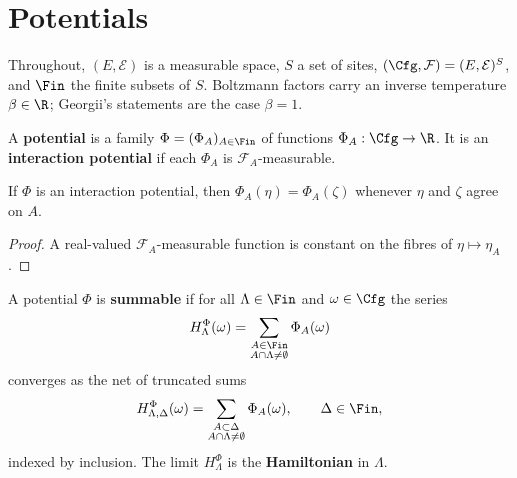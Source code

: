 \section{Potentials}

Throughout, $(E,\mathcal{E})$ is a measurable space, $S$ a set of sites,
$(\Cfg,\mathcal{F})=(E,\mathcal{E})^S$, and $\Fin$ the finite subsets of $S$.
Boltzmann factors carry an inverse temperature $\beta\in\R$; Georgii's statements are the case
$\beta=1$.

\begin{definition}
    \label{def:pot-potential}
    \leanok{}

    A \textbf{potential} is a family $\Phi=(\Phi_A)_{A\in\Fin}$ of functions
    $\Phi_A:\Cfg\to\R$. It is an \textbf{interaction potential} if each $\Phi_A$ is
    $\mathcal{F}_A$-measurable.
\end{definition}

\begin{lemma}
    \label{lem:pot-depends-on}
    \leanok{}

    If $\Phi$ is an interaction potential, then $\Phi_A(\eta)=\Phi_A(\zeta)$ whenever
    $\eta$ and $\zeta$ agree on $A$.
\end{lemma}
\begin{proof}
    \leanok{}

    A real-valued $\mathcal{F}_A$-measurable function is constant on the fibres of
    $\eta\mapsto\eta_A$.
\end{proof}

\begin{definition}
    \label{def:pot-hamiltonian}
    \leanok{}

    A potential $\Phi$ is \textbf{summable} if for all $\Lambda\in\Fin$ and $\omega\in\Cfg$ the
    series
    \[
      H_\Lambda^\Phi(\omega)=\sum_{\substack{A\in\Fin\\ A\cap\Lambda\neq\emptyset}}\Phi_A(\omega)
    \]
    converges as the net of truncated sums
    \[
      H_{\Lambda,\Delta}^\Phi(\omega)
        =\sum_{\substack{A\subset\Delta\\ A\cap\Lambda\neq\emptyset}}\Phi_A(\omega),\qquad
      \Delta\in\Fin,
    \]
    indexed by inclusion. The limit $H_\Lambda^\Phi$ is the \textbf{Hamiltonian} in $\Lambda$.
\end{definition}

